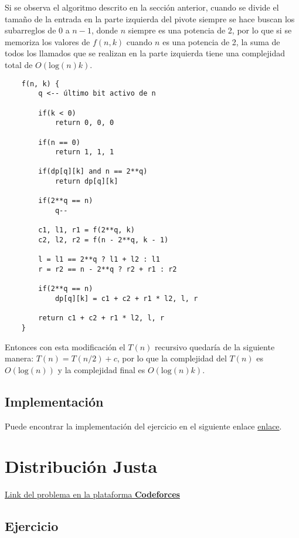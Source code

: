 \documentclass{article}
\begin{document}
Si se observa el algoritmo descrito en la sección anterior, cuando se divide el tamaño de la entrada en la parte izquierda del pivote
siempre se hace buscan los subarreglos de 0 a $n-1$, donde $n$ siempre es una potencia de 2, por lo que si se memoriza los valores de
$f(n,k)$ cuando $n$ es una potencia de 2, la suma de todos los llamados que se realizan en la parte izquierda tiene una complejidad total
de $O(\text{log}(n)k)$.

\begin{verbatim}
    f(n, k) {
        q <-- último bit activo de n 

        if(k < 0)
            return 0, 0, 0

        if(n == 0)
            return 1, 1, 1

        if(dp[q][k] and n == 2**q)
            return dp[q][k]

        if(2**q == n) 
            q--

        c1, l1, r1 = f(2**q, k)
        c2, l2, r2 = f(n - 2**q, k - 1)

        l = l1 == 2**q ? l1 + l2 : l1
        r = r2 == n - 2**q ? r2 + r1 : r2

        if(2**q == n)
            dp[q][k] = c1 + c2 + r1 * l2, l, r  
        
        return c1 + c2 + r1 * l2, l, r 
    }
\end{verbatim}

Entonces con esta modificación el $T(n)$ recursivo quedaría de la siguiente manera: $T(n) = T(n/2) + c$,
por lo que la complejidad del $T(n)$ es $O(\text{log}(n))$ y la complejidad final es $O(\text{log}(n)k)$.

\subsection{Implementación}

Puede encontrar la implementación del ejercicio en el siguiente enlace \href{https://github.com/raudel25/DAA-Project/blob/main/problems/b/b.cpp}{enlace}.

\section{Distribución Justa}

\href{https://codeforces.com/gym/105053/problem/F}{Link del problema en la plataforma \textbf{Codeforces}}

\subsection{Ejercicio}
\end{document}
